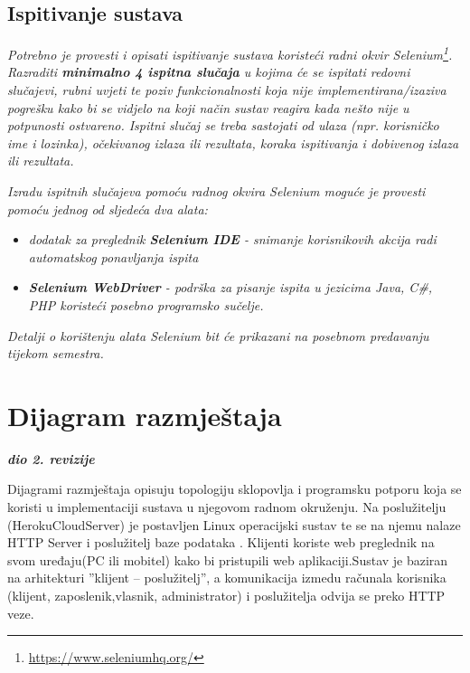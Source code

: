 			
			
			\subsection{Ispitivanje sustava}
			
			 \textit{Potrebno je provesti i opisati ispitivanje sustava koristeći radni okvir Selenium\footnote{\url{https://www.seleniumhq.org/}}. Razraditi \textbf{minimalno 4 ispitna slučaja} u kojima će se ispitati redovni slučajevi, rubni uvjeti te poziv funkcionalnosti koja nije implementirana/izaziva pogrešku kako bi se vidjelo na koji način sustav reagira kada nešto nije u potpunosti ostvareno. Ispitni slučaj se treba sastojati od ulaza (npr. korisničko ime i lozinka), očekivanog izlaza ili rezultata, koraka ispitivanja i dobivenog izlaza ili rezultata.\\ }
			 
			 \textit{Izradu ispitnih slučajeva pomoću radnog okvira Selenium moguće je provesti pomoću jednog od sljedeća dva alata:}
			 \begin{itemize}
			 	\item \textit{dodatak za preglednik \textbf{Selenium IDE} - snimanje korisnikovih akcija radi automatskog ponavljanja ispita	}
			 	\item \textit{\textbf{Selenium WebDriver} - podrška za pisanje ispita u jezicima Java, C\#, PHP koristeći posebno programsko sučelje.}
			 \end{itemize}
		 	\textit{Detalji o korištenju alata Selenium bit će prikazani na posebnom predavanju tijekom semestra.}
			
			\eject 
\section{Dijagram razmještaja}
	
	\textbf{\textit{dio 2. revizije}}
	
	\text Dijagrami razmještaja opisuju topologiju sklopovlja i programsku potporu koja se koristi u implementaciji sustava u njegovom radnom okruženju. Na poslužitelju
	(HerokuCloudServer) je postavljen Linux operacijski sustav te se na njemu nalaze HTTP Server i poslužitelj baze podataka . Klijenti koriste web preglednik na svom uređaju(PC ili mobitel) kako bi pristupili web aplikaciji.Sustav je baziran na arhitekturi ”klijent – poslužitelj”, a komunikacija izmedu računala korisnika (klijent, zaposlenik,vlasnik, administrator) i poslužitelja odvija se preko HTTP veze.  

